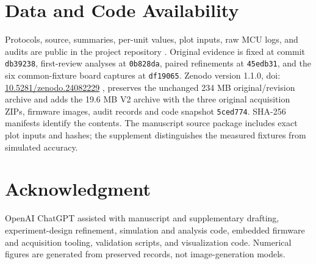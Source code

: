 \documentclass[journal,twoside,web]{ieeecolor}
\begin{document}
\section*{Data and Code Availability}
Protocols, source, summaries, per-unit values, plot inputs, raw MCU logs, and audits are public in the project repository \cite{code}. Original evidence is fixed at commit \texttt{db39238}, first-review analyses at \texttt{0b828da}, paired refinements at \texttt{45edb31}, and the six common-fixture board captures at \texttt{df19065}. Zenodo version 1.1.0, doi: \href{https://doi.org/10.5281/zenodo.24082229}{10.5281/zenodo.24082229} \cite{data}, preserves the unchanged 234 MB original/revision archive and adds the 19.6 MB V2 archive with the three original acquisition ZIPs, firmware images, audit records and code snapshot \texttt{5ced774}. SHA-256 manifests identify the contents. The manuscript source package includes exact plot inputs and hashes; the supplement distinguishes the measured fixtures from simulated accuracy.

\section*{Acknowledgment}
OpenAI ChatGPT assisted with manuscript and supplementary drafting, experiment-design refinement, simulation and analysis code, embedded firmware and acquisition tooling, validation scripts, and visualization code. Numerical figures are generated from preserved records, not image-generation models.

\end{document}
